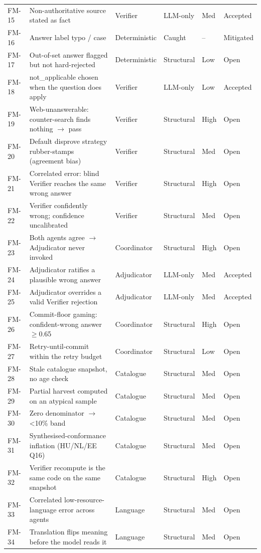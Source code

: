 {\begin{longtable}[]{@{}
  L{0.0960}
  L{0.3777}
  L{0.1422}
  L{0.1274}
  L{0.1099}
  L{0.1419}@{}}
FM-15 & Non-authoritative source stated as fact & Verifier & LLM-only & Med & Accepted \\
FM-16 & Answer label typo / case & Deterministic & Caught & -- & Mitigated \\
FM-17 & Out-of-set answer flagged but not hard-rejected & Deterministic & Structural & Low & Open \\
FM-18 & not\_\allowbreak applicable chosen when the question does apply & Verifier & LLM-only & Low & Accepted \\
FM-19 & Web-unanswerable: counter-search finds nothing $\rightarrow$ pass & Verifier & Structural & High & Open \\
FM-20 & Default disprove strategy rubber-stamps (agreement bias) & Verifier & Structural & Med & Open \\
FM-21 & Correlated error: blind Verifier reaches the same wrong answer & Verifier & Structural & High & Open \\
FM-22 & Verifier confidently wrong; confidence uncalibrated & Verifier & Structural & Med & Open \\
FM-23 & Both agents agree $\rightarrow$ Adjudicator never invoked & Coordinator & Structural & High & Open \\
FM-24 & Adjudicator ratifies a plausible wrong answer & Adjudicator & LLM-only & Med & Accepted \\
FM-25 & Adjudicator overrides a valid Verifier rejection & Adjudicator & LLM-only & Med & Accepted \\
FM-26 & Commit-floor gaming: confident-wrong answer $\geq$0.65 & Coordinator & Structural & High & Open \\
FM-27 & Retry-until-commit within the retry budget & Coordinator & Structural & Low & Open \\
FM-28 & Stale catalogue snapshot, no age check & Catalogue & Structural & Med & Open \\
FM-29 & Partial harvest computed on an atypical sample & Catalogue & Structural & Med & Open \\
FM-30 & Zero denominator $\rightarrow$ \textless10\% band & Catalogue & Structural & Med & Open \\
FM-31 & Synthesised-conformance inflation (HU/NL/EE Q16) & Catalogue & Structural & Med & Open \\
FM-32 & Verifier recompute is the same code on the same snapshot & Catalogue & Structural & High & Open \\
FM-33 & Correlated low-resource-language error across agents & Language & Structural & Med & Open \\
FM-34 & Translation flips meaning before the model reads it & Language & Structural & Med & Open \\
\end{longtable}
}


